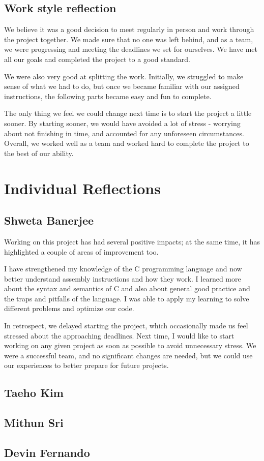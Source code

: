 \documentclass[11pt]{article}
\begin{document}
\subsection{Work style reflection}
We believe it was a good decision to meet regularly in person and work through the project together. We made sure that no one was left behind, and as a team, we were progressing and meeting the deadlines we set for ourselves. We have met all our goals and completed the project to a good standard. 

We were also very good at splitting the work. Initially, we struggled to make sense of what we had to do, but once we became familiar with our assigned instructions, the following parts became easy and fun to complete. 

The only thing we feel we could change next time is to start the project a little sooner. By starting sooner, we would have avoided a lot of stress - worrying about not finishing in time, and accounted for any unforeseen circumstances. Overall, we worked well as a team and worked hard to complete the project to the best of our ability. 

\section{Individual Reflections}
\subsection{Shweta Banerjee}
Working on this project has had several positive impacts; at the same time, it has highlighted a couple of areas of improvement too. 

I have strengthened my knowledge of the C programming language and now better understand assembly instructions and how they work. I learned more about the syntax and semantics of C and also about general good practice and the traps and pitfalls of the language. I was able to apply my learning to solve different problems and optimize our code. 

In retrospect, we delayed starting the project, which occasionally made us feel stressed about the approaching deadlines. Next time, I would like to start working on any given project as soon as possible to avoid unnecessary stress. We were a successful team, and no significant changes are needed, but we could use our experiences to better prepare for future projects. 

\subsection{Taeho Kim}

\subsection{Mithun Sri}

\subsection{Devin Fernando}
\end{document}
